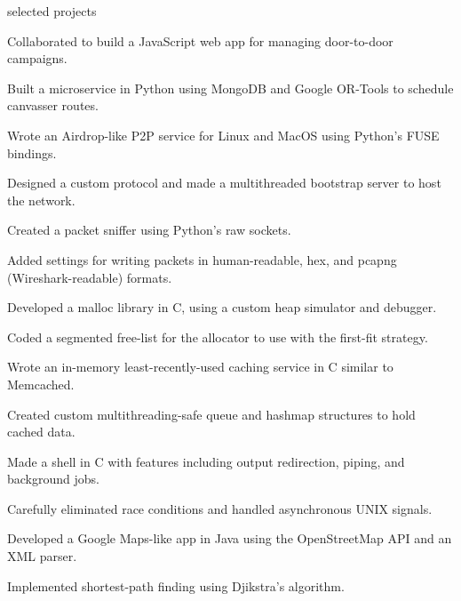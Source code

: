 \documentclass{cv}
\begin{document}
\begin{cvsection}{selected projects}
  {
    \item Collaborated to build a JavaScript web app for managing door-to-door campaigns.
    \item Built a microservice in Python using MongoDB and Google OR-Tools to schedule canvasser routes.
  }
  {
    \item Wrote an Airdrop-like P2P service for Linux and MacOS using Python's FUSE bindings.
    \item Designed a custom protocol and made a multithreaded bootstrap server to host the network.
  }
  {
    \item Created a packet sniffer using Python's raw sockets.
    \item Added settings for writing packets in human-readable, hex, and pcapng (Wireshark-readable) formats.
  }
  {
    \item Developed a malloc library in C, using a custom heap simulator and debugger.
    \item Coded a segmented free-list for the allocator to use with the first-fit strategy.
  }
  {
    \item Wrote an in-memory least-recently-used caching service in C similar to Memcached.
    \item Created custom multithreading-safe queue and hashmap structures to hold cached data.
  }
  {
    \item Made a shell in C with features including output redirection, piping, and background jobs. 
    \item Carefully eliminated race conditions and handled asynchronous UNIX signals.
  }
  {
    \item Developed a Google Maps-like app in Java using the OpenStreetMap API and an XML parser.
    \item Implemented shortest-path finding using Djikstra's algorithm.
  }
\end{cvsection}
\end{document}

